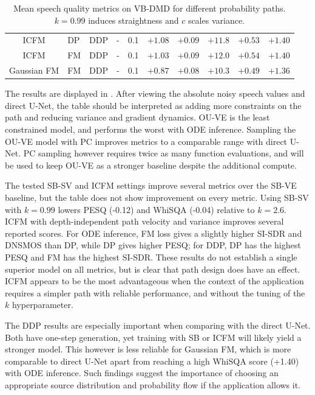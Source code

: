 \begin{table}[htbp]
{\begin{tabular}{cllll|ccccc}
ICFM & DP & DDP & - & 0.1 & \cellcolor{bestblue}$+1.08$ & \cellcolor{bestblue}$+0.09$ & $+11.8$ & $+0.53$ & \cellcolor{bestblue}$+1.40$\\
ICFM & FM & DDP & - & 0.1 & \cellcolor{secondorange}$+1.03$ & \cellcolor{bestblue}$+0.09$ & \cellcolor{bestblue}$+12.0$ & \cellcolor{secondorange}$+0.54$ & \cellcolor{bestblue}$+1.40$\\
Gaussian FM & FM & DDP & - & 0.1 & $+0.87$ & \cellcolor{secondorange}$+0.08$ & $+10.3$ & $+0.49$ & $+1.36$\\
            \bottomrule
        \end{tabular}
}
\caption{Mean speech quality metrics on \ac{VB-DMD} for different probability paths. $k=0.99$ induces straightness and $c$ scales variance.}
\label{tab:results}
\end{table}
The results are displayed in . After viewing the absolute noisy speech values and direct U-Net, the table should be interpreted as adding more constraints on the path and reducing variance and gradient dynamics. \ac{OU-VE} is the least constrained model, and performs the worst with \ac{ODE} inference. Sampling the \ac{OU-VE} model with \ac{PC} improves metrics to a comparable range with direct U-Net. \ac{PC} sampling however requires twice as many function evaluations, and will be used to keep \ac{OU-VE} as a stronger baseline despite the additional compute.


The tested \ac{SB-SV} and \ac{ICFM} settings improve several metrics over the \ac{SB-VE} baseline, but the table does not show improvement on every metric. Using \ac{SB-SV} with $k=0.99$ lowers \ac{PESQ} (-0.12) and WhiSQA (-0.04) relative to $k=2.6$. \ac{ICFM} with depth-independent path velocity and variance improves several reported scores. For \ac{ODE} inference, \ac{FM} loss gives a slightly higher \ac{SI-SDR} and DNSMOS than DP, while DP gives higher \ac{PESQ}; for \ac{DDP}, DP has the highest \ac{PESQ} and \ac{FM} has the highest SI-SDR. These results do not establish a single superior model on all metrics, but is clear that path design does have an effect. \ac{ICFM} appears to be the most advantageous when the context of the application requires a simpler path with reliable performance, and without the tuning of the $k$ hyperparameter.

The \ac{DDP} results are especially important when comparing with the direct U-Net. Both have one-step generation, yet training with SB or \ac{ICFM} will likely yield a stronger model. This however is less reliable for Gaussian \ac{FM}, which is more comparable to direct U-Net apart from reaching a high WhiSQA score (+1.40) with \ac{ODE} inference. Such findings suggest the importance of choosing an appropriate source distribution and probability flow if the application allows it.

